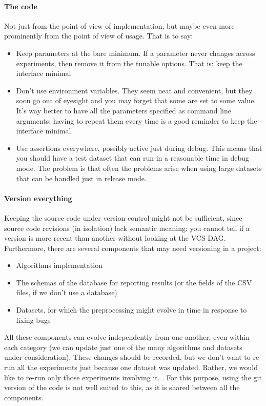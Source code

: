 \documentclass{llncs}
\begin{document}
\paragraph{The code}

Not just from the point of view of implementation, but maybe even more
prominently from the point of view of usage. That is to say:

\begin{itemize}
\item Keep parameters at the bare minimum. If a parameter never changes across
  experiments, then remove it from the tunable options. That is: keep the
  interface minimal
\item Don't use environment variables. They seem neat and convenient, but they soon
  go out of eyesight and you may forget that some are set to some value. It's
  way better to have all the parameters specified as command line arguments:
  having to repeat them every time is a good reminder to keep the interface
  minimal.
\item Use assertions everywhere, possibly active just during debug. This means that
  you should have a test dataset that can run in a reasonable time in debug
  mode. The problem is that often the problems arise when using large datasets
  that can be handled just in release mode.
\end{itemize}

\paragraph{Version everything}

Keeping the source code under version control might not be sufficient, since
source code revisions (in isolation) lack semantic meaning: you cannot tell
if a version is more recent than another without looking at the VCS DAG.
Furthermore, there are several components that may need versioning in
a project:
\begin{itemize}
  \item Algorithms implementation
  \item The schemas of the database for reporting results (or the fields of 
    the CSV files, if we don't use a database)
  \item Datasets, for which the preprocessing might evolve in time in 
    response to fixing bugs
\end{itemize}
All these components can evolve independently from one another, even within each category
(we can update just one of the many algorithms and datasets under consideration).
These changes should be recorded, but we don't want to re-run all the experiments just because
one dataset was updated. Rather, we would like to re-run only those experiments involving it.
.
For this purpose, using the git version of the code is not well suited to this, as it is
shared between all the components.
\end{document}
